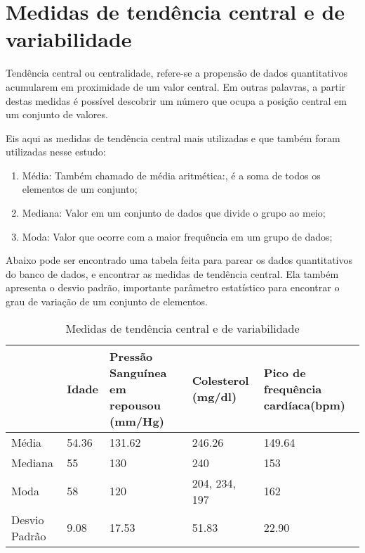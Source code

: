 \chapter{Medidas de tendência central e de variabilidade}

    Tendência central ou centralidade, refere-se a propensão de dados quantitativos acumularem
    em proximidade de um valor central. Em outras palavras, a partir destas medidas é possível 
    descobrir um número que ocupa a posição central em um conjunto de valores.

    Eis aqui as medidas de tendência central mais utilizadas e que também foram utilizadas nesse 
    estudo:

    \begin{enumerate}[label={\alph*)}]
      \addtolength{\itemindent}{1.25cm}
      \item Média: Também chamado de média aritmética:, é a soma de todos os elementos de um conjunto;
      \item Mediana: Valor em um conjunto de dados que divide o grupo ao meio;
      \item Moda: Valor que ocorre com a maior frequência em um grupo de dados;
    \end{enumerate}

    Abaixo pode ser encontrado uma tabela feita para parear os dados quantitativos do banco de dados, 
    e encontrar as medidas de tendência central. Ela também apresenta o desvio padrão, importante 
    parâmetro estatístico para encontrar o grau de variação de um conjunto de elementos.

    \begin{table}[htb]
      \caption{Medidas de tendência central e de variabilidade}
      \centering
        \begin{tabular}{ |P{2.8cm} |P{2cm}|P{3cm}|P{3cm}|P{3cm}|  }
          \hline
            & Idade & Pressão Sanguínea em repousou     (mm/Hg) & Colesterol  (mg/dl) & Pico de frequência cardíaca(bpm)\\
          \hline
          Média & 54.36 & 131.62 & 246.26 & 149.64 \\
          \hline
          Mediana & 55 & 130 & 240 & 153 \\
          \hline
          Moda & 58 & 120 & 204, 234, 197 & 162 \\
          \hline
          Desvio Padrão & 9.08 & 17.53 & 51.83 & 22.90 \\
          \hline
        \end{tabular}
    \end{table}

